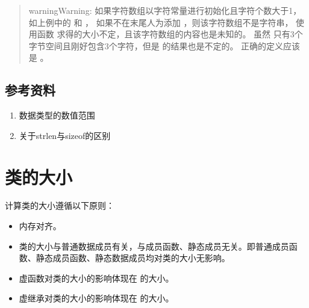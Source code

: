 \documentclass[letterpaper,10pt,english]{sphinxmanual}
\begin{document}
\begin{enumerate}
\begin{quote}
\begin{sphinxadmonition}{warning}{Warning:}
如果字符数组以字符常量进行初始化且字符个数大于1，如上例中的  和  ，
如果不在末尾人为添加  ，则该字符数组不是字符串，
使用函数  求得的大小不定，且该字符数组的内容也是未知的。
虽然  只有3个字节空间且刚好包含3个字符，但是  的结果也是不定的。
正确的定义应该是  。
\end{sphinxadmonition}
\end{quote}

\end{enumerate}


\subsection{参考资料}
\label{\detokenize{cpp/03_typeSize:id3}}\begin{enumerate}
\item {} 
数据类型的数值范围

\end{enumerate}
\begin{quote}

\end{quote}
\begin{enumerate}
\setcounter{enumi}{1}
\item {} 
关于strlen与sizeof的区别

\end{enumerate}
\begin{quote}

\end{quote}


\section{类的大小}
\label{\detokenize{cpp/04_classSize::doc}}\label{\detokenize{cpp/04_classSize:id1}}
计算类的大小遵循以下原则：
\begin{itemize}
\item {} 
内存对齐。

\item {} 
类的大小与普通数据成员有关，与成员函数、静态成员无关。即普通成员函数、静态成员函数、静态数据成员均对类的大小无影响。

\item {} 
虚函数对类的大小的影响体现在  的大小。

\item {} 
虚继承对类的大小的影响体现在  的大小。

\end{itemize}
\end{document}
